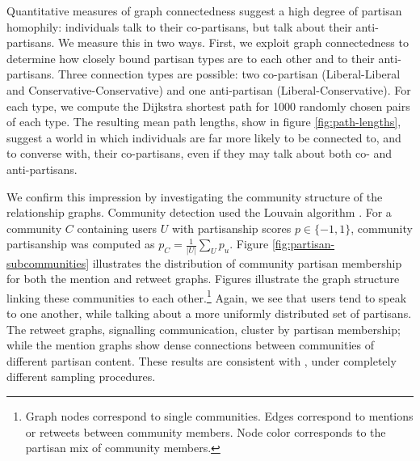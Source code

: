 \documentclass{article}
\begin{document}
Quantitative measures of graph connectedness suggest a high degree of
partisan homophily: individuals talk to their co-partisans, but talk
about their anti-partisans. We measure this in two ways. First, we
exploit graph connectedness to determine how closely bound partisan
types are to each other and to their anti-partisans. Three connection
types are possible: two co-partisan (Liberal-Liberal and
Conservative-Conservative) and one anti-partisan
(Liberal-Conservative). For each type, we compute the Dijkstra
shortest path for 1000 randomly chosen pairs of each type. The resulting
mean path lengths, show in figure \ref{fig:path-lengths}, suggest a world in which
individuals are far more likely to be connected to, and to converse
with, their co-partisans, even if they may talk about both co- and
anti-partisans.

We confirm this impression by investigating the community structure of
the relationship graphs. Community detection used the Louvain
algorithm \cite{blondel2008fast}. For a community $C$ containing
users $U$ with partisanship scores $p \in \{-1, 1\}$, community partisanship was computed
as $p_C = \frac{1}{\left|U\right|}\sum_U p_u$. Figure
\ref{fig:partisan-subcommunities} 
illustrates the distribution of community partisan membership
for both the mention and retweet graphs. Figures
 illustrate the graph
structure linking these communities to each other.\footnote{Graph
  nodes correspond to single communities. Edges correspond to mentions
or retweets between community members. Node color corresponds to the
partisan mix of community members.} Again, we see that users tend
to speak to one another, while talking about a more uniformly
distributed set of partisans. The retweet graphs, signalling
communication, cluster by partisan membership; while the mention
graphs show dense connections between communities of different
partisan content. These results are consistent with
\cite{conover2011}, under completely different sampling procedures. 



\end{document}

